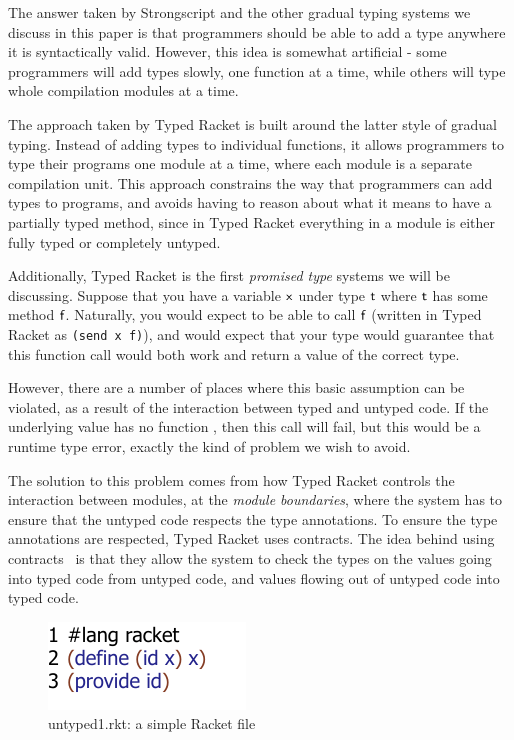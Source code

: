 \documentclass[a4paper,USenglish]{tex/lipics-v2016}
\begin{document}
The answer taken by Strongscript and the other gradual typing systems we
discuss in this paper is that programmers should be able to add a type
anywhere it is syntactically valid. However, this idea is somewhat
artificial - some programmers will add types slowly, one function at a time,
while others will type whole compilation modules at a time.

The approach taken by Typed Racket is built around the latter style of
gradual typing.  Instead of adding types to individual functions, it allows
programmers to type their programs one module at a time, where each module
is a separate compilation unit.  This approach constrains the way that
programmers can add types to programs, and avoids having to reason
about what it means to have a partially typed method, since in Typed Racket
everything in a module is either fully typed or completely untyped.

Additionally, Typed Racket is the first \emph{promised type} systems
we will be discussing. Suppose that you have a variable ${\sf{x}}$ under type $\t$
where $\t$ has some method ${\sf{f}}$. Naturally, you would expect to be able
to call ${\sf{f}}$ (written in Typed Racket as \verb|(send x f)|), and would expect that your type
would guarantee that this function call would both work and return a value
of the correct type.

However, there are a number of places where this basic assumption can be
violated, as a result of the interaction between typed and untyped code. If the
underlying value has no function , then this call will fail, but this
would be a runtime type error, exactly the kind of problem we wish to avoid.

The solution to this problem comes from how Typed Racket controls the
interaction between modules, at the \emph{module boundaries}, where the
system has to ensure that the untyped code respects the type annotations. To
ensure the type annotations are respected, Typed Racket uses
contracts. The idea behind using contracts~\cite{ff-icfp02} is that they allow
the system to check the types on the values going into typed code from
untyped code, and values flowing out of untyped code into typed code.

\begin{figure}[h]
\includegraphics{figures/untyped-rkt1.pdf}
\caption{untyped1.rkt: a simple Racket file}
\label{fig:ut1r}
\end{figure}
\end{document}
